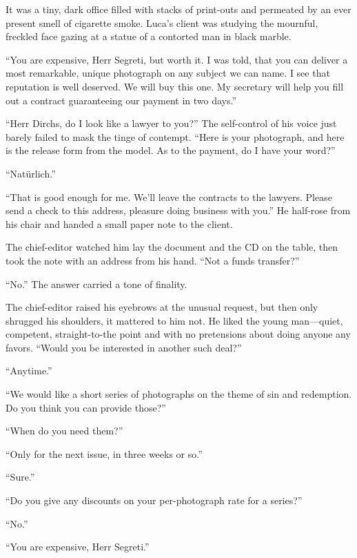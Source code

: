 It was a tiny, dark office filled with stacks of print-outs and permeated by an ever present smell of cigarette smoke. Luca's client was studying the mournful, freckled face gazing at a statue of a contorted man in black marble.

``You are expensive, Herr Segreti, but worth it. I was told, that you can deliver a most remarkable, unique photograph on any subject we can name. I see that reputation is well deserved. We will buy this one. My secretary will help you fill out a contract guaranteeing our payment in two days.''

``Herr Dirchs, do I look like a lawyer to you?'' The self-control of his voice just barely failed to mask the tinge of contempt. ``Here is your photograph, and here is the release form from the model. As to the payment, do I have your word?''


``Natürlich.''


``That is good enough for me. We'll leave the contracts to the lawyers. Please send a check to this address, pleasure doing business with you.'' He half-rose from his chair and handed a small paper note to the client.

The chief-editor watched him lay the document and the CD on the table, then took the note with an address from his hand. ``Not a funds transfer?''

``No.'' The answer carried a tone of finality.

The chief-editor raised his eyebrows at the unusual request, but then only shrugged his shoulders, it mattered to him not. He liked the young man---quiet, competent, straight-to-the point and with no pretensions about doing anyone any favors. ``Would you be interested in another such deal?''

``Anytime.''

``We would like a short series of photographs on the theme of sin and redemption. Do you think you can provide those?''

``When do you need them?''

``Only for the next issue, in three weeks or so.''

``Sure.''

``Do you give any discounts on your per-photograph rate for a series?''

``No.''

``You are expensive, Herr Segreti.''

